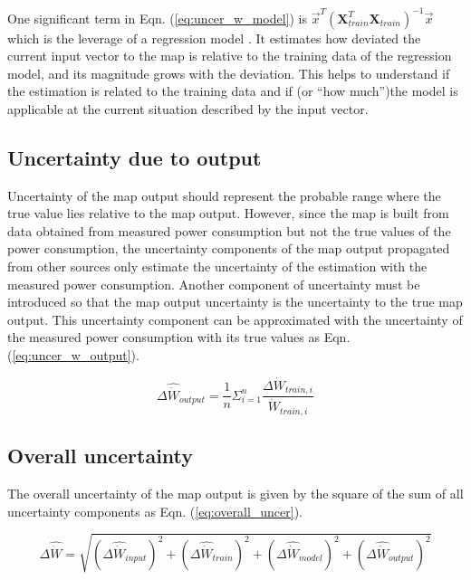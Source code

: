 One significant term in Eqn. (\ref{eq:uncer_w_model}) is ${\vec x^T}{({\mathbf{X}}_{train}^T{{\mathbf{X}}_{train}})^{ - 1}}\vec x$ which is the leverage of a regression model \cite{Atkinson:1987}. It estimates how deviated the current input vector to the map is relative to the training data of the regression model, and its magnitude grows with the deviation. This helps to understand if the estimation is related to the training data and if (or ``how much'')the model is applicable at the current situation described by the input vector.

\subsection{Uncertainty due to output} \label{subsec:uncer_output}

Uncertainty of the map output should represent the probable range where the true value lies relative to the map output. However, since the map is built from data obtained from measured power consumption but not the true values of the power consumption, the uncertainty components of the map output propagated from other sources only estimate the uncertainty of the estimation with the measured power consumption. Another component of uncertainty must be introduced so that the map output uncertainty is the uncertainty to the true map output. This uncertainty component can be approximated with the uncertainty of the measured power consumption with its true values as Eqn. (\ref{eq:uncer_w_output}).

\begin{equation}
\Delta {\hat{\dot{W}}_{output}} = \frac{1}{n}\Sigma _{i = 1}^n\frac{{\Delta {{\dot{W}}_{train,i}}}}{{{{\dot{W}}_{train,i}}}}
\label{eq:uncer_w_output}
\end{equation}

\subsection{Overall uncertainty} \label{subsec:overall_uncer}

The overall uncertainty of the map output is given by the square of the sum of all uncertainty components as Eqn. (\ref{eq:overall_uncer}).

\begin{equation}
\Delta \hat{\dot{W}}= \sqrt {{{(\Delta {{\hat{\dot{W}}}_{input}})}^2} + {{(\Delta {{\hat{\dot{W}}}_{train}})}^2} + {{(\Delta {{\hat{\dot{W}}}_{model}})}^2} + {{(\Delta {{\hat{\dot{W}}}_{output}})}^2}}
\label{eq:overall_uncer}
\end{equation}